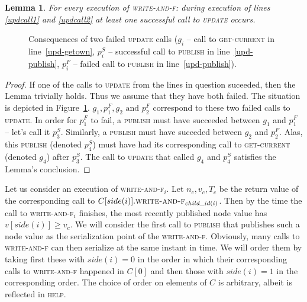 \documentclass[a4paper,11pt]{article}
\newcommand{\atomic}[4]{\node(lab#1) at (#3,-#4+0.5) {#2};\draw (#3,-#4-0.1) to (lab#1);\node[inner sep=0pt](#1) at (#3,-#4) {};}
\newtheorem{lemma}{Lemma}
\newcommand{\fn}[1]{\textsc{#1}}
\begin{document}
\begin{lemma}
	For every execution of \fn{write-and-f}: during execution of lines \ref{updcall1} and \ref{updcall2} at least one successful call to \fn{update} occurs.
\end{lemma}
\begin{figure}
\caption{Consequences of two failed \fn{update} calls ($g_i$ -- call to \fn{get-current} in line~\ref{upd-getown}, $p^S_{i}$ -- successful call to \fn{publish} in line~\ref{upd-publish}, $p^F_{i}$ -- failed call to \fn{publish} in line~\ref{upd-publish}).}
\label{fig-only-two-pubs}
\end{figure}

\begin{proof}
	If one of the calls to \fn{update} from the lines in question suceeded, then the Lemma trivially holds. Thus we assume that they have both failed. The situation is depicted
	in Figure~\ref{fig-only-two-pubs}. $g_1, p^F_1, g_2 \text{ and } p^F_2$ correspond to these two failed calls to \fn{update}. In order for $p^F_1$ to fail, a \fn{publish} must have
	succeeded between $g_1$ and $p^F_1$ -- let's call it $p^S_3$. Similarly, a \fn{publish} must have suceeded between $g_2$ and $p^F_2$. Alas, this \fn{publish} (denoted $p^S_4$) must have had
	its corresponding call to \fn{get-current} (denoted $g_4$) after $p^S_3$. The call to \fn{update} that called $g_4$ and $p^S_4$ satisfies the Lemma's conclusion.
\end{proof}

Let us consider an execution of \fn{write-and-f$_i$}. Let $n_c, v_c, T_c$ be the return value of the corresponding call to $C[side(i)].\fn{write-and-f$_{child\_id(i)}$}$. Then by the time the call to
\fn{write-and-f$_i$} finishes, the most recently published node value has $v[side(i)] \geq v_c$. We will consider the first call to \fn{publish} that publishes such a node value as the serialization
point of the \fn{write-and-f}. Obviously, many calls to \fn{write-and-f} can then serialize at the same instant in time. We will order them by taking first these with $side(i) = 0$ in the order in which
their corresponding calls to \fn{write-and-f} happened in $C[0]$ and then those with $side(i) = 1$ in the corresponding order. The choice of order on elements of $C$ is arbitrary, albeit is reflected
in \fn{help}.
\end{document}
